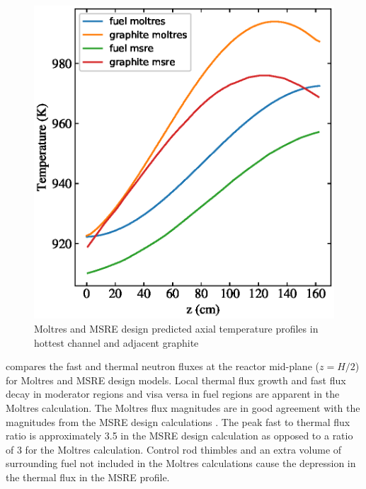 \documentclass{article}
\makeatletter
\def\maxwidth#1{\ifdim\Gin@nat@width>#1 #1\else\Gin@nat@width\fi}
\makeatother
\begin{document}
\begin{figure}[htpb]
    \centering
    \includegraphics[width=\maxwidth{\textwidth}]{combined_msre_moltres_axial_temps.eps}
    \caption{Moltres and \gls{MSRE} design
      \cite[p. 99]{briggs_molten-salt_1964} predicted axial temperature profiles in hottest channel
      and adjacent graphite}
    \label{fig:temp_compare}
\end{figure}


 compares the fast and thermal neutron fluxes at
the reactor mid-plane ($z=H/2$) for Moltres and \gls{MSRE} design models. Local
thermal flux growth and fast flux decay in moderator regions and visa versa in
fuel regions are apparent in the Moltres calculation. The Moltres flux
magnitudes are in good agreement with the magnitudes from the \gls{MSRE} design
calculations \cite[p. 92]{briggs_molten-salt_1964}. The peak fast to thermal
flux ratio is approximately 3.5 in the \gls{MSRE} design calculation as opposed
to a ratio of 3 for the Moltres calculation. Control rod thimbles and an extra
volume of surrounding fuel not included in the Moltres calculations cause the
depression in the thermal flux in the \gls{MSRE} profile.
\end{document}
